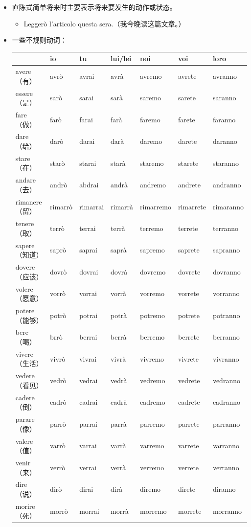 \documentclass[UTF8,a4paper,titlepage,10pt]{report}
\begin{document}
\begin{enumerate}
\begin{itemize}
\item 直陈式简单将来时主要表示将来要发生的动作或状态。
\begin{itemize}
\item Leggerò l'articolo questa sera.（我今晚读这篇文章。）
\end{itemize}
\item 一些不规则动词：
\begin{center}
\begin{tabular}{lllllll}
 & io & tu & lui/lei & noi & voi & loro\\
\hline
avere（有） & avrò & avrai & avrà & avremo & avrete & avranno\\
essere（是） & sarò & sarai & sarà & saremo & sarete & saranno\\
fare（做） & farò & farai & farà & faremo & farete & faranno\\
dare（给） & darò & darai & darà & daremo & darete & daranno\\
stare（在） & starò & starai & starà & staremo & starete & staranno\\
andare（去） & andrò & abdrai & andrà & andremo & andrete & andranno\\
rimanere（留） & rimarrò & rimarrai & rimarrà & rimarremo & rimarrete & rimaranno\\
tenere（取） & terrò & terrai & terrà & terremo & terrete & terranno\\
sapere（知道） & saprò & saprai & saprà & sapremo & saprete & sapranno\\
dovere（应该） & dovrò & dovrai & dovrà & dovremo & dovrete & dovranno\\
volere（愿意） & vorrò & vorrai & vorrà & vorremo & vorrete & vorranno\\
potere（能够） & potrò & potrai & potrà & potremo & potrete & potranno\\
bere（喝） & brrò & berrai & berrà & berremo & berrete & berranno\\
vivere（生活） & vivrò & vivrai & vivrà & vivremo & vivrete & vivranno\\
vedere（看见） & vedrò & vedrai & vedrà & vedremo & vedrete & vedranno\\
cadere（倒） & cadrò & cadrai & cadrà & cadremo & cadrete & cadranno\\
parare（像） & parrò & parrai & parrà & parremo & parrete & parranno\\
valere（值） & varrò & varrai & varrà & varremo & varrete & varranno\\
venir（来） & verrò & verrai & verrà & verremo & verrete & verranno\\
dire（说） & dirò & dirai & dirà & diremo & direte & diranno\\
morire（死） & morrò & morrai & morrà & morremo & morrete & morranno\\
\end{tabular}
\end{center}
\end{itemize}


\end{enumerate}
\end{document}
